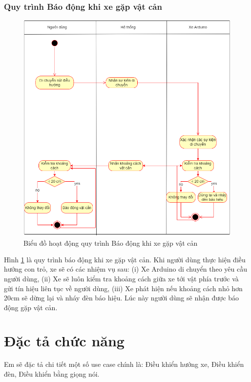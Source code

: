 \documentclass[../DoAn.tex]{subfiles}
\begin{document}
\subsubsection{Quy trình Báo động khi xe gặp vật cản}
\label{subsection:2.2.3.3}
\begin{figure}[H]
    \includegraphics[scale = 0.6]{Hinhve/activity_bao_dong_vat_can.png}
    \centering
    \caption{Biểu đồ hoạt động quy trình Báo động khi xe gặp vật cản}
    \label{fig:2.2.3.3}
\end{figure}

Hình \ref{fig:2.2.3.3} là quy trình báo động khi xe gặp vật cản. Khi người dùng thực hiện điều hướng con trỏ, xe sẽ có các nhiệm vụ sau: (i) Xe Arduino di chuyển theo yêu cầu người dùng, (ii) Xe sẽ luôn kiểm tra khoảng cách giữa xe tới vật phía trước và gửi tín hiệu liên tục về người dùng, (iii) Xe phát hiện nếu khoảng cách nhỏ hơn 20cm sẽ dừng lại và nháy đèn báo hiệu. Lúc này người dùng sẽ nhận được báo động gặp vật cản.

\section{Đặc tả chức năng}
\label{section:2.3}
Em sẽ đặc tả chi tiết một số use case chính là: Điều khiển hướng xe, Điều khiển đèn, Điều khiển bằng giọng nói.
\end{document}
